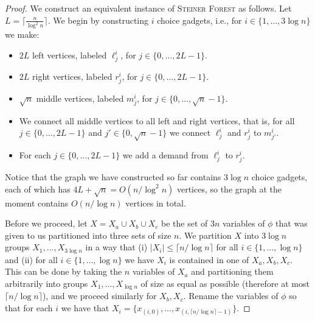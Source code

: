 \documentclass[a4paper]{article}
\theoremstyle{plain}
\newcommand{\pname}[1]{\textsc{#1}}
\newcommand{\SF}{\pname{Steiner Forest}\xspace}
\begin{document}
\begin{proof}
We construct an equivalent instance of \SF as follows. Let
$L=\lceil\frac{n}{\log^2n}\rceil$. We  begin by constructing $i$ choice
gadgets, i.e., for $i\in \{1,\ldots,3\log n\}$ we make:

\begin{itemize}

\item $2L$ left vertices, labeled $\ell^i_j$, for $j\in\{0,\ldots,2L-1\}$.

\item $2L$ right vertices, labeled $r^i_j$, for $j\in\{0,\ldots,2L-1\}$.

\item $\sqrt{n}$ middle vertices, labeled $m^i_j$, for
$j\in\{0,\ldots,\sqrt{n}-1\}$. 

\item We connect all middle vertices to all left and right vertices, that is,
for all $j\in\{0,\ldots,2L-1\}$ and $j'\in\{0,\sqrt{n}-1\}$ we connect
$\ell^i_j$ and $r^i_j$ to $m^i_{j'}$.

\item For each $j\in\{0,\ldots,2L-1\}$ we add a demand from $\ell^i_j$ to
$r^i_j$.

\end{itemize}

Notice that the graph we have constructed so far contains $3\log n$ choice
gadgets, each of which has $4L+\sqrt{n}=O(n/\log^2n)$ vertices, so the graph at
the moment contains $O(n/\log n)$ vertices in total.

Before we proceed, let $X=X_a\cup X_b\cup X_c$ be the set of $3n$ variables of
$\phi$ that was given to us partitioned into three sets of size $n$. We
partition $X$ into $3\log n$ groups $X_1,\ldots,X_{3\log n}$ in a way that (i)
$|X_i|\le \lceil n/\log n\rceil$ for all $i\in\{1,\ldots,\log n\}$ and (ii) for
all $i\in\{1,\ldots,\log n\}$ we have $X_i$ is contained in one of
$X_a,X_b,X_c$. This can be done by taking the $n$ variables of $X_a$ and
partitioning them arbitrarily into groups $X_1,\ldots,X_{\log n}$ of size as
equal as possible (therefore at most $\lceil n/\log n\rceil$), and we proceed
similarly for $X_b,X_c$. Rename the variables of $\phi$ so that for each $i$ we
have that $X_i=\{x_{(i,0)},\ldots,x_{(i,\lceil n/\log n \rceil-1)}\}$.


\end{proof}
\end{document}
